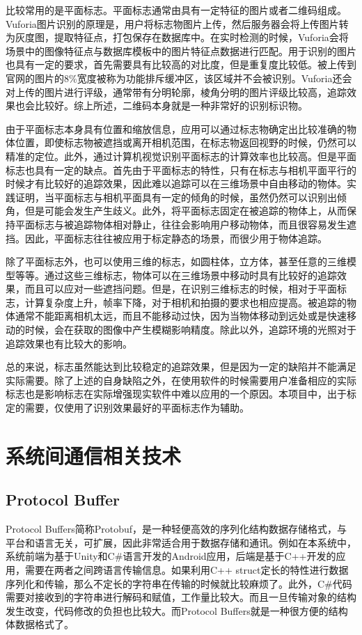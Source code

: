 比较常用的是平面标志。平面标志通常由具有一定特征的图片或者二维码组成。Vuforia图片识别的原理是，用户将标志物图片上传，然后服务器会将上传图片转为灰度图，提取特征点，打包保存在数据库中。在实时检测的时候，Vuforia会将场景中的图像特征点与数据库模板中的图片特征点数据进行匹配。用于识别的图片也具有一定的要求，首先需要具有比较高的对比度，但是重复度比较低。被上传到官网的图片的8\%宽度被称为功能排斥缓冲区，该区域并不会被识别。Vuforia还会对上传的图片进行评级，通常带有分明轮廓，棱角分明的图片评级比较高，追踪效果也会比较好。综上所述，二维码本身就是一种非常好的识别标识物。

由于平面标志本身具有位置和缩放信息，应用可以通过标志物确定出比较准确的物体位置，即使标志物被遮挡或离开相机范围，在标志物返回视野的时候，仍然可以精准的定位。此外，通过计算机视觉识别平面标志的计算效率也比较高。但是平面标志也具有一定的缺点。首先由于平面标志的特性，只有在标志与相机平面平行的时候才有比较好的追踪效果，因此难以追踪可以在三维场景中自由移动的物体。实践证明，当平面标志与相机平面具有一定的倾角的时候，虽然仍然可以识别出倾角，但是可能会发生产生歧义。此外，将平面标志固定在被追踪的物体上，从而保持平面标志与被追踪物体相对静止，往往会影响用户移动物体，而且很容易发生遮挡。因此，平面标志往往被应用于标定静态的场景，而很少用于物体追踪。

除了平面标志外，也可以使用三维的标志，如圆柱体，立方体，甚至任意的三维模型等等。通过这些三维标志，物体可以在三维场景中移动时具有比较好的追踪效果，而且可以应对一些遮挡问题。但是，在识别三维标志的时候，相对于平面标志，计算复杂度上升，帧率下降，对于相机和拍摄的要求也相应提高。被追踪的物体通常不能距离相机太远，而且不能移动过快，因为当物体移动到远处或是快速移动的时候，会在获取的图像中产生模糊影响精度。除此以外，追踪环境的光照对于追踪效果也有比较大的影响。

总的来说，标志虽然能达到比较稳定的追踪效果，但是因为一定的缺陷并不能满足实际需要。除了上述的自身缺陷之外，在使用软件的时候需要用户准备相应的实际标志也是影响标志在实际增强现实软件中难以应用的一个原因。本项目中，出于标定的需要，仅使用了识别效果最好的平面标志作为辅助。

\section{系统间通信相关技术}
\subsection{Protocol Buffer}
Protocol Buffers简称Protobuf，是一种轻便高效的序列化结构数据存储格式，与平台和语言无关，可扩展，因此非常适合用于数据存储和通讯。例如在本系统中，系统前端为基于Unity和C\#语言开发的Android应用，后端是基于C++开发的应用，需要在两者之间跨语言传输信息。如果利用C++ struct定长的特性进行数据序列化和传输，那么不定长的字符串在传输的时候就比较麻烦了。此外，C\#代码需要对接收到的字符串进行解码和赋值，工作量比较大。而且一旦传输对象的结构发生改变，代码修改的负担也比较大。而Protocol Buffers就是一种很方便的结构体数据格式了。

